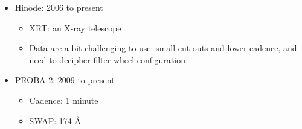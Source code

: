 \documentclass[11pt]{article}%
\begin{document}
\begin{itemize}
\item Hinode: 2006 to present
    \begin{itemize}
    \item XRT: an X-ray telescope
    \item Data are a bit challenging to use: small cut-outs and lower cadence,
        and need to decipher filter-wheel configuration
    \end{itemize}
\item PROBA-2: 2009 to present
    \begin{itemize}
    \item Cadence: 1 minute
    \item SWAP: 174 \AA
    \end{itemize}
\end{itemize}
\end{document}
